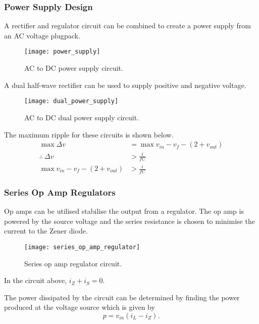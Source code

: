 \documentclass{article}
\begin{document}
\subsubsection{Power Supply Design}
A rectifier and regulator circuit can be combined to create a power supply from an AC voltage plugpack.
\begin{figure}[H]
    \centering
    \texttt{[image: power\_supply]}
    \caption{AC to DC power supply circuit.}
\end{figure}
A dual half-wave rectifier can be used to supply positive and negative voltage.
\begin{figure}[H]
    \centering
    \texttt{[image: dual\_power\_supply]}
    \caption{AC to DC dual power supply circuit.}
\end{figure}
The maximum ripple for these circuits is shown below.
\begin{align*}
    \max{\Delta v} & = \max{v_{in}} - v_f - \left( 2 + v_{out} \right) \\
    \therefore\: \Delta v & > \frac{i}{fC} \\
    \max{v_{in}} - v_f - \left( 2 + v_{out} \right) & > \frac{i}{fC}
\end{align*}
\subsubsection{Series Op Amp Regulators}
Op amps can be utilised stabilise the output from a regulator.
The op amp is powered by the source voltage and the series resistance is chosen to minimise the current to the Zener diode.
\begin{figure}[H]
    \centering
    \texttt{[image: series\_op\_amp\_regulator]}
    \caption{Series op amp regulator circuit.}
\end{figure}
In the circuit above, $i_Z + i_S = 0$.

The power dissipated by the circuit can be determined by finding the power produced at the voltage source
which is given by
\begin{equation*}
    p = v_{in} \left( i_L - i_Z \right).
\end{equation*}
\end{document}
